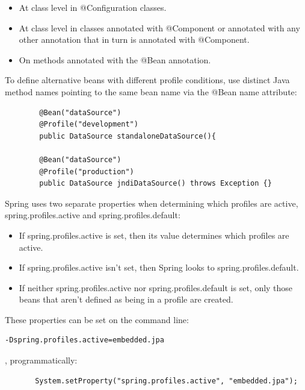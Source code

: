 \documentclass{scrartcl}
\begin{document}
   \begin{itemize}
       \item At class level in @Configuration classes.
       \item At class level in classes annotated with @Component or annotated with any other annotation that in turn is annotated with @Component.
       \item On methods annotated with the @Bean annotation.
   \end{itemize}

    To define alternative beans with different profile conditions, use distinct Java method names pointing to the same bean name via the @Bean name attribute:

    \begin{lstlisting}
        @Bean("dataSource")
        @Profile("development")
        public DataSource standaloneDataSource(){

        @Bean("dataSource")
        @Profile("production")
        public DataSource jndiDataSource() throws Exception {}

    \end{lstlisting}

   Spring uses two separate properties when determining which profiles are active, spring.profiles.active and spring.profiles.default:

    \begin{itemize}
       \item If spring.profiles.active is set,  then its value determines which profiles are active.
       \item If spring.profiles.active isn’t set, then Spring looks to spring.profiles.default.
       \item If neither spring.profiles.active nor spring.profiles.default is set, only those beans that aren’t defined as being in a profile are created.
    \end{itemize}

   These properties can be set on the command line:

   \begin{lstlisting}[language=bash]
       -Dspring.profiles.active=embedded.jpa
   \end{lstlisting}

   , programmatically:

   \begin{lstlisting}
       System.setProperty("spring.profiles.active", "embedded.jpa");
   \end{lstlisting}
\end{document}
